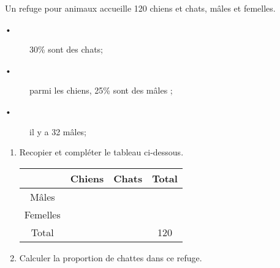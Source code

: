 
Un refuge pour animaux accueille 120 chiens et chats, mâles et femelles.

\begin{description}
\item[•] 30\% sont des chats;
\item[•] parmi les chiens, 25\% sont des mâles ;
\item[•] il y a 32 mâles;
\end{description}


\begin{enumerate}
\item Recopier et compléter le tableau ci-dessous.

\begin{tabular}{|c|c|c|c|}
\hline 
  & Chiens & Chats & Total \\ 
\hline 
Mâles &   &   &   \\ 
\hline 
Femelles &   &   &   \\ 
\hline 
Total &   &   & 120 \\ 
\hline 
\end{tabular} 

\item Calculer la proportion de chattes dans ce refuge.
\end{enumerate}
 